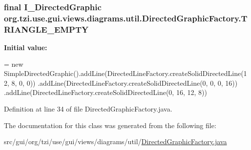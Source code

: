 \hypertarget{classorg_1_1tzi_1_1use_1_1gui_1_1views_1_1diagrams_1_1util_1_1_directed_graphic_factory_adce0f23df7d8c62ba8a1a1259d500f2d}{
\subsubsection[{T\-R\-I\-A\-N\-G\-L\-E\-\_\-\-E\-M\-P\-T\-Y}]{\setlength{\rightskip}{0pt plus 5cm}final {\bf I\-\_\-\-Directed\-Graphic} org.\-tzi.\-use.\-gui.\-views.\-diagrams.\-util.\-Directed\-Graphic\-Factory.\-T\-R\-I\-A\-N\-G\-L\-E\-\_\-\-E\-M\-P\-T\-Y\hspace{0.3cm}{\ttfamily [static]}}}\label{classorg_1_1tzi_1_1use_1_1gui_1_1views_1_1diagrams_1_1util_1_1_directed_graphic_factory_adce0f23df7d8c62ba8a1a1259d500f2d}
{\bfseries Initial value\-:}
\begin{DoxyCode}
=
            \textcolor{keyword}{new} SimpleDirectedGraphic().addLine(DirectedLineFactory.createSolidDirectedLine(12, 8, 0, 0))
            .addLine(DirectedLineFactory.createSolidDirectedLine(0, 0, 0, 16))
            .addLine(DirectedLineFactory.createSolidDirectedLine(0, 16, 12, 8))
\end{DoxyCode}


Definition at line 34 of file Directed\-Graphic\-Factory.\-java.



The documentation for this class was generated from the following file\-:\begin{DoxyCompactItemize}
\item 
src/gui/org/tzi/use/gui/views/diagrams/util/\hyperlink{_directed_graphic_factory_8java}{Directed\-Graphic\-Factory.\-java}\end{DoxyCompactItemize}
